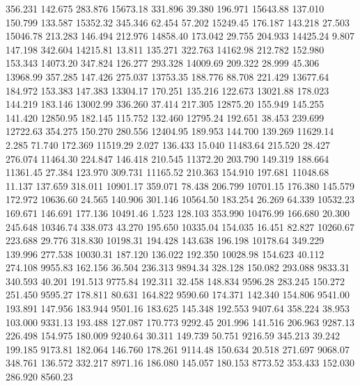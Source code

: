  356.231  142.675  283.876     15673.18
 331.896   39.380  196.971     15643.88
 137.010  150.799  133.587     15352.32
 345.346   62.454   57.202     15249.45
 176.187  143.218   27.503     15046.78
 213.283  146.494  212.976     14858.40
 173.042   29.755  204.933     14425.24
   9.807  147.198  342.604     14215.81
  13.811  135.271  322.763     14162.98
 212.782  152.980  153.343     14073.20
 347.824  126.277  293.328     14009.69
 209.322   28.999   45.306     13968.99
 357.285  147.426  275.037     13753.35
 188.776   88.708  221.429     13677.64
 184.972  153.383  147.383     13304.17
 170.251  135.216  122.673     13021.88
 178.023  144.219  183.146     13002.99
 336.260   37.414  217.305     12875.20
 155.949  145.255  141.420     12850.95
 182.145  115.752  132.460     12795.24
 192.651   38.453  239.699     12722.63
 354.275  150.270  280.556     12404.95
 189.953  144.700  139.269     11629.14
   2.285   71.740  172.369     11519.29
   2.027  136.433   15.040     11483.64
 215.520   28.427  276.074     11464.30
 224.847  146.418  210.545     11372.20
 203.790  149.319  188.664     11361.45
  27.384  123.970  309.731     11165.52
 210.363  154.910  197.681     11048.68
  11.137  137.659  318.011     10901.17
 359.071   78.438  206.799     10701.15
 176.380  145.579  172.972     10636.60
  24.565  140.906  301.146     10564.50
 183.254   26.269   64.339     10532.23
 169.671  146.691  177.136     10491.46
   1.523  128.103  353.990     10476.99
 166.680   20.300  245.648     10346.74
 338.073   43.270  195.650     10335.04
 154.035   16.451   82.827     10260.67
 223.688   29.776  318.830     10198.31
 194.428  143.638  196.198     10178.64
 349.229  139.996  277.538     10030.31
 187.120  136.022  192.350     10028.98
 154.623   40.112  274.108      9955.83
 162.156   36.504  236.313      9894.34
 328.128  150.082  293.088      9833.31
 340.593   40.201  191.513      9775.84
 192.311   32.458  148.834      9596.28
 283.245  150.272  251.450      9595.27
 178.811   80.631  164.822      9590.60
 174.371  142.340  154.806      9541.00
 193.891  147.956  183.944      9501.16
 183.625  145.348  192.553      9407.64
 358.224   38.953  103.000      9331.13
 193.488  127.087  170.773      9292.45
 201.996  141.516  206.963      9287.13
 226.498  154.975  180.009      9240.64
  30.311  149.739   50.751      9216.59
 345.213   39.242  199.185      9173.81
 182.064  146.760  178.261      9114.48
 150.634   20.518  271.697      9068.07
 348.761  136.572  332.217      8971.16
 186.080  145.057  180.153      8773.52
 353.433  152.030  286.920      8560.23

